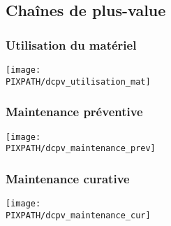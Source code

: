 \subsection{Chaînes de plus-value}

\subsubsection{Utilisation du matériel}
\begin{center}
    \texttt{[image: \\PIXPATH/dcpv\_utilisation\_mat]}
\end{center}
\subsubsection{Maintenance préventive}
\begin{center}
    \texttt{[image: \\PIXPATH/dcpv\_maintenance\_prev]}
\end{center}
\subsubsection{Maintenance curative}
\begin{center}
    \texttt{[image: \\PIXPATH/dcpv\_maintenance\_cur]}
\end{center}
